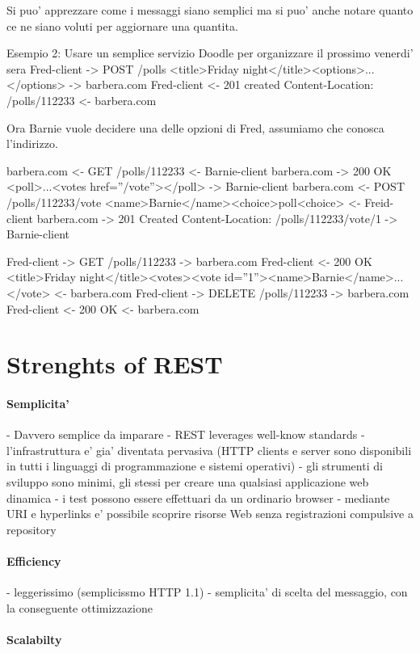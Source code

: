 Si puo' apprezzare come i messaggi siano semplici ma si puo' anche notare quanto ce ne siano voluti per aggiornare una quantita.

Esempio 2: Usare un semplice servizio Doodle per organizzare il prossimo venerdi' sera
Fred-client -> POST /polls <title>Friday night</title><options>...</options> -> barbera.com
Fred-client <- 201 created Content-Location: /polls/112233 <- barbera.com

Ora Barnie vuole decidere una delle opzioni di Fred, assumiamo che conosca l'indirizzo.

barbera.com <- GET /polls/112233 <- Barnie-client
barbera.com -> 200 OK <poll>...<votes href=''/vote''></poll> -> Barnie-client
barbera.com <- POST /polls/112233/vote <name>Barnie</name><choice>poll<choice> <- Freid-client
barbera.com -> 201 Created Content-Location: /polls/112233/vote/1 -> Barnie-client

Fred-client -> GET /polls/112233 -> barbera.com
Fred-client <- 200 OK <title>Friday night</title><votes><vote id=''1''><name>Barnie</name>...</vote> <- barbera.com
Fred-client -> DELETE /polls/112233 -> barbera.com
Fred-client <- 200 OK <- barbera.com

\section{Strenghts of REST}
\paragraph{Semplicita'}
- Davvero semplice da imparare
- \gls{REST} leverages well-know standards
- l'infrastruttura e' gia' diventata pervasiva (HTTP clients e server sono disponibili in tutti i linguaggi di programmazione e sistemi operativi)
- gli strumenti di sviluppo sono minimi, gli stessi per creare una qualsiasi applicazione web dinamica
- i test possono essere effettuari da un ordinario browser
- mediante URI e hyperlinks e' possibile scoprire risorse Web senza registrazioni compulsive a repository
\paragraph{Efficiency}
- leggerissimo (semplicissmo HTTP 1.1)
- semplicita' di scelta del messaggio, con la conseguente ottimizzazione
\paragraph{Scalabilty}

